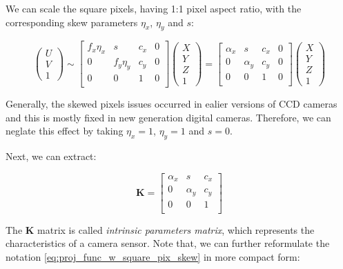 \documentclass[a4paper]{report}
\numberwithin{figure}{section}
\begin{document}
We can scale the square pixels, having 1:1 pixel aspect ratio, with the 
corresponding skew parameters $\eta_x$, $\eta_y$ and $s$:

\begin{equation}
  \begin{pmatrix}
    U\\
    V\\
    1
  \end{pmatrix}
  \sim
  \begin{bmatrix}
    f_x\eta_x & s & c_x & 0\\
    0 & f_y\eta_y & c_y & 0\\
    0 & 0 & 1 & 0\\
  \end{bmatrix}
  \begin{pmatrix}
    X\\
    Y\\
    Z\\
    1
  \end{pmatrix}
  =
  \begin{bmatrix}
    \alpha_x & s & c_x & 0\\
    0 & \alpha_y & c_y & 0\\
    0 & 0 & 1 & 0\\
  \end{bmatrix}
  \begin{pmatrix}
    X\\
    Y\\
    Z\\
    1
  \end{pmatrix}
\end{equation} \label{eq:proj_func_w_square_pix_skew}

Generally, the skewed pixels issues occurred in ealier versions of CCD cameras 
and this is mostly fixed in new generation digital cameras. Therefore, 
we can neglate this effect by taking $\eta_x=1$, $\eta_y=1$ and $s=0$.

Next, we can extract:

\begin{equation}
  \mathbf{K} = 
  \begin{bmatrix}
    \alpha_x & s & c_x\\
    0 & \alpha_y & c_y\\
    0 & 0 & 1\\
  \end{bmatrix}
\end{equation} \label{eq:k_matrix}

The $\mathbf{K}$ matrix is called 
\textit{intrinsic parameters matrix}, which represents the characteristics of 
a camera sensor. Note that, we 
can further reformulate the notation \ref{eq:proj_func_w_square_pix_skew} in more 
compact form:
\end{document}
